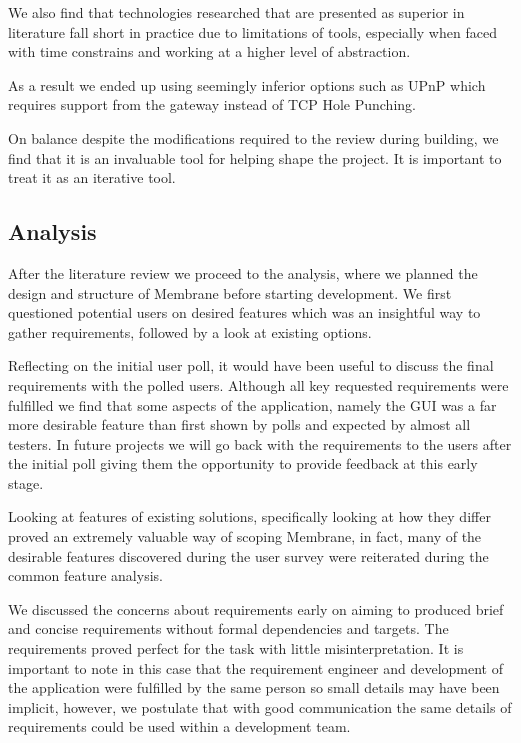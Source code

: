 \documentclass[11pt, a4paper, twoside]{report}
\begin{document}
We also find that technologies researched that are presented as superior in literature fall short in practice due to limitations of tools, especially when faced with time constrains and working at a higher level of abstraction.

As a result we ended up using seemingly inferior options such as UPnP which requires support from the gateway instead of TCP Hole Punching.

On balance despite the modifications required to the review during building, we find that it is an invaluable tool for helping shape the project. It is important to treat it as an iterative tool.

\subsection{Analysis}

After the literature review we proceed to the analysis, where we planned the design and structure of Membrane before starting development. We first questioned potential users on desired features which was an insightful way to gather requirements, followed by a look at existing options.

Reflecting  on the initial user poll, it would have been useful to discuss the final requirements with the polled users. Although all key requested requirements were fulfilled we find that some aspects of the application, namely the GUI was a far more desirable feature than first shown by polls and expected by almost all testers. In future projects we will go back with the requirements to the users after the initial poll giving them the opportunity to provide feedback at this early stage.

Looking at features of existing solutions, specifically looking at how they differ proved an extremely valuable way of scoping Membrane, in fact, many of the desirable features discovered during the user survey were reiterated during the common feature analysis.

We discussed the concerns about requirements early on aiming to produced brief and concise requirements without formal dependencies and targets. The requirements proved perfect for the task with little misinterpretation. It is important to note in this case that the requirement engineer and development of the application were fulfilled by the same person so small details may have been implicit, however, we postulate that with good communication the same details of requirements could be used within a development team.
\end{document}

